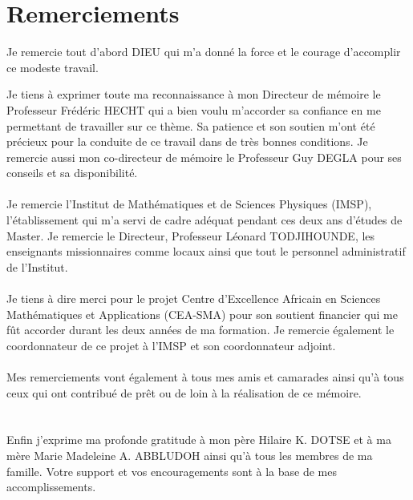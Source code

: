 \chapter*{Remerciements}
\begin{flushleft}
Je remercie tout d'abord DIEU qui m'a donné la force et le courage d'accomplir ce modeste travail.
\end{flushleft}
\[\]
Je tiens à exprimer toute ma reconnaissance à mon Directeur de mémoire le Professeur Frédéric HECHT qui a bien voulu m'accorder sa confiance en me permettant de travailler sur ce thème. Sa patience et son soutien m'ont été précieux pour la conduite de ce travail dans de très bonnes conditions. Je remercie aussi mon co-directeur de mémoire le Professeur Guy DEGLA pour ses conseils et sa disponibilité.\\\\
Je remercie l'Institut de Mathématiques et de Sciences Physiques (IMSP), l'établissement qui m'a servi de cadre adéquat pendant ces deux ans d'études de Master. Je remercie le Directeur, Professeur Léonard TODJIHOUNDE, les enseignants missionnaires comme locaux ainsi que tout le personnel administratif de l'Institut.\\\\
Je tiens à dire merci pour le projet Centre d'Excellence Africain en Sciences Mathématiques et Applications (CEA-SMA) pour son soutient financier qui me fût accorder durant les deux années de ma formation. Je remercie également le coordonnateur de ce projet à l'IMSP et son coordonnateur adjoint.\\\\
Mes remerciements vont également à tous mes amis et camarades ainsi qu'à tous ceux qui ont contribué de prêt ou de loin à la réalisation de ce mémoire.\\\\\\
Enfin j'exprime ma profonde gratitude à mon père Hilaire K. DOTSE et à ma mère Marie Madeleine A. ABBLUDOH ainsi qu'à tous les membres de ma famille. Votre support et vos encouragements sont à la base de mes accomplissements.